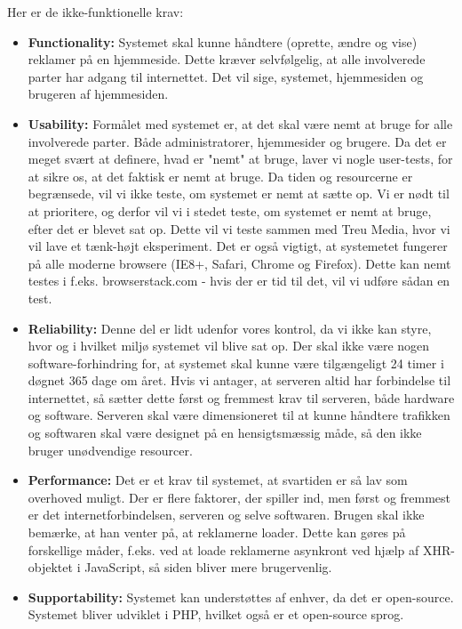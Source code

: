 \documentclass[a4paper,12pt]{article}
\begin{document}
Her er de ikke-funktionelle krav:
\begin{itemize}
	\item \textbf{Functionality:} Systemet skal kunne håndtere (oprette, ændre og vise) reklamer på en hjemmeside. Dette kræver selvfølgelig, at alle involverede parter har adgang til internettet. Det vil sige, systemet, hjemmesiden og brugeren af hjemmesiden.
	\item \textbf{Usability:} Formålet med systemet er, at det skal være nemt at bruge for alle involverede parter. Både administratorer, hjemmesider og brugere. Da det er meget svært at definere, hvad er "nemt" at bruge, laver vi nogle user-tests, for at sikre os, at det faktisk er nemt at bruge. Da tiden og resourcerne er begrænsede, vil vi ikke teste, om systemet er nemt at sætte op. Vi er nødt til at prioritere, og derfor vil vi i stedet teste, om systemet er nemt at bruge, efter det er blevet sat op. Dette vil vi teste sammen med Treu Media, hvor vi vil lave et tænk-højt eksperiment. Det er også vigtigt, at systemetet fungerer på alle moderne browsere (IE8+, Safari, Chrome og Firefox). Dette kan nemt testes i f.eks. browserstack.com - hvis der er tid til det, vil vi udføre sådan en test.
	\item \textbf{Reliability:} Denne del er lidt udenfor vores kontrol, da vi ikke kan styre, hvor og i hvilket miljø systemet vil blive sat op. Der skal ikke være nogen software-forhindring for, at systemet skal kunne være tilgængeligt 24 timer i døgnet 365 dage om året. Hvis vi antager, at serveren altid har forbindelse til internettet, så sætter dette først og fremmest krav til serveren, både hardware og software. Serveren skal være dimensioneret til at kunne håndtere trafikken og softwaren skal være designet på en hensigtsmæssig måde, så den ikke bruger unødvendige resourcer.
	\item \textbf{Performance:} Det er et krav til systemet, at svartiden er så lav som overhoved muligt. Der er flere faktorer, der spiller ind, men først og fremmest er det internetforbindelsen, serveren og selve softwaren. Brugen skal ikke bemærke, at han venter på, at reklamerne loader. Dette kan gøres på forskellige måder, f.eks. ved at loade reklamerne asynkront ved hjælp af XHR-objektet i JavaScript, så siden bliver mere brugervenlig.
	\item \textbf{Supportability:} Systemet kan understøttes af enhver, da det er open-source. Systemet bliver udviklet i PHP, hvilket også er et open-source sprog.
\end{itemize}
\end{document}
